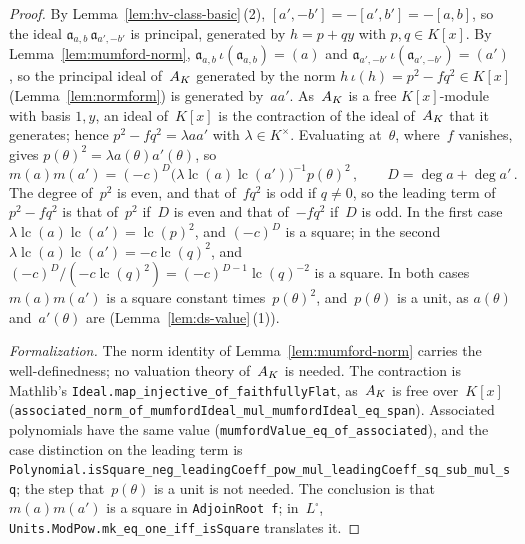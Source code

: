 \begin{proof}
\leanok
{}
By Lemma~\ref{lem:hv-class-basic}\,(2), $[a', -b'] = -[a', b'] = -[a, b]$, so the ideal
$\mathfrak a_{a,b}\,\mathfrak a_{a',-b'}$ is principal, generated by $h = p + qy$ with
$p, q \in K[x]$. By Lemma~\ref{lem:mumford-norm},
$\mathfrak a_{a,b}\,\iota(\mathfrak a_{a,b}) = (a)$ and
$\mathfrak a_{a',-b'}\,\iota(\mathfrak a_{a',-b'}) = (a')$, so the principal ideal of~$A_{K}$
generated by the norm $h\,\iota(h) = p^2 - fq^2 \in K[x]$ (Lemma~\ref{lem:normform}) is generated
by~$aa'$. As~$A_{K}$ is a free $K[x]$-module with basis $1, y$, an ideal of~$K[x]$ is the
contraction of the ideal of~$A_{K}$ that it generates; hence $p^2 - fq^2 = \lambda aa'$ with
$\lambda \in K^\times$. Evaluating at~$\theta$, where~$f$ vanishes, gives
$p(\theta)^2 = \lambda a(\theta)a'(\theta)$, so
\[ m(a)m(a') = (-c)^D\bigl(\lambda\operatorname{lc}(a)\operatorname{lc}(a')\bigr)^{-1}
   p(\theta)^2\,, \qquad D = \deg a + \deg a'\,. \]
The degree of~$p^2$ is even, and that of~$fq^2$ is odd if $q \ne 0$, so the leading term of
$p^2 - fq^2$ is that of~$p^2$ if~$D$ is even and that of~$-fq^2$ if~$D$ is odd. In the first case
$\lambda\operatorname{lc}(a)\operatorname{lc}(a') = \operatorname{lc}(p)^2$, and $(-c)^D$ is a
square; in the second $\lambda\operatorname{lc}(a)\operatorname{lc}(a') =
-c\operatorname{lc}(q)^2$, and
$(-c)^D/(-c\operatorname{lc}(q)^2) = (-c)^{D-1}\operatorname{lc}(q)^{-2}$ is a square. In both
cases $m(a)m(a')$ is a square constant times~$p(\theta)^2$, and~$p(\theta)$ is a unit, as
$a(\theta)$ and~$a'(\theta)$ are (Lemma~\ref{lem:ds-value}\,(1)).

\emph{Formalization.} The norm identity of Lemma~\ref{lem:mumford-norm} carries the
well-definedness; no valuation theory of~$A_{K}$ is needed. The contraction is Mathlib's
\texttt{Ideal.map\_injective\_of\_faithfullyFlat}, as~$A_{K}$ is free over~$K[x]$
(\texttt{associated\_norm\_of\_mumfordIdeal\_mul\_mumfordIdeal\_eq\_span}). Associated polynomials
have the same value (\texttt{mumfordValue\_eq\_of\_associated}), and the case distinction on the
leading term is
\texttt{Polynomial.isSquare\_neg\_leadingCoeff\_pow\_mul\_leadingCoeff\_sq\_sub\_mul\_sq}; the step
that~$p(\theta)$ is a unit is not needed. The conclusion is that $m(a)m(a')$ is a square in
\texttt{AdjoinRoot f}; in~$L^\square$, \texttt{Units.ModPow.mk\_eq\_one\_iff\_isSquare} translates
it.
\end{proof}

